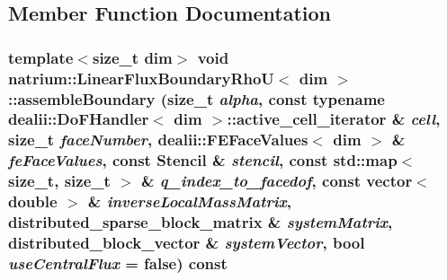 \subsection{Member Function Documentation}
\hypertarget{classnatrium_1_1LinearFluxBoundaryRhoU_a4572f65018de568b40f56921e8f89788}{
\subsubsection[{assembleBoundary}]{\setlength{\rightskip}{0pt plus 5cm}template$<$size\_\-t dim$>$ void {\bf natrium::LinearFluxBoundaryRhoU}$<$ dim $>$::assembleBoundary (size\_\-t {\em alpha}, \/  const typename dealii::DoFHandler$<$ dim $>$::active\_\-cell\_\-iterator \& {\em cell}, \/  size\_\-t {\em faceNumber}, \/  dealii::FEFaceValues$<$ dim $>$ \& {\em feFaceValues}, \/  const {\bf Stencil} \& {\em stencil}, \/  const std::map$<$ size\_\-t, size\_\-t $>$ \& {\em q\_\-index\_\-to\_\-facedof}, \/  const vector$<$ double $>$ \& {\em inverseLocalMassMatrix}, \/  distributed\_\-sparse\_\-block\_\-matrix \& {\em systemMatrix}, \/  distributed\_\-block\_\-vector \& {\em systemVector}, \/  bool {\em useCentralFlux} = {\ttfamily false}) const}}
\label{classnatrium_1_1LinearFluxBoundaryRhoU_a4572f65018de568b40f56921e8f89788}


